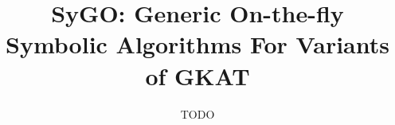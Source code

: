 \documentclass[manuscript,screen,review,anonymous]{acmart}
\begin{document}
\title{SyGO: Generic On-the-fly Symbolic Algorithms For Variants of GKAT}

\author{TODO}








\renewcommand{\shortauthors}{Trovato et al.}
\end{document}
